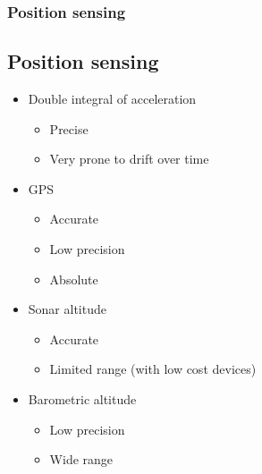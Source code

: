 \documentclass[10pt,serif,t]{beamer}
\newenvironment{SubSlide}[1]
{
  \begin{frame}[fragile,environment=SubSlide]
    \frametitle{#1}
    \subsection{#1}
  }
  {
  \end{frame}
}
\begin{document}
\begin{SubSlide}{Position sensing}
  \begin{itemize}
    \item
      Double integral of acceleration

      \begin{itemize}
        \item
          Precise

        \item
          Very prone to drift over time

      \end{itemize}

      \pause

    \item
      GPS

      \begin{itemize}
        \item
          Accurate

        \item
          Low precision

        \item
          Absolute

      \end{itemize}

      \pause

    \item
      Sonar altitude

      \begin{itemize}
        \item
          Accurate

        \item
          Limited range (with low cost devices)

      \end{itemize}

    \item
      Barometric altitude

      \begin{itemize}
        \item
          Low precision

        \item
          Wide range

      \end{itemize}

  \end{itemize}
\end{SubSlide}
\end{document}
